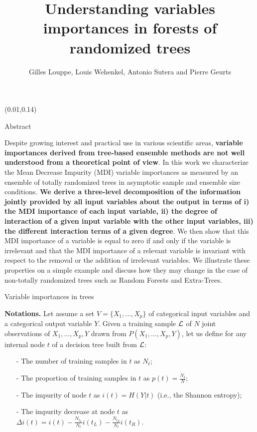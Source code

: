 \documentclass[final]{beamer}
\title{Understanding variables importances in forests of randomized trees}
\author{Gilles Louppe, Louis Wehenkel, Antonio Sutera and Pierre Geurts}
\date{}
\begin{document}
\begin{frame}{}



\begin{textblock}{0.32}(0.01,0.14)


\begin{block}{Abstract \phantom{p}}

Despite growing interest and practical use in various scientific areas, \textbf{variable
importances derived from tree-based ensemble methods are not well understood
from a theoretical point of view}. In this work we characterize the Mean Decrease
Impurity (MDI) variable importances as measured by an ensemble of totally
randomized trees in asymptotic sample and ensemble size conditions. \textbf{We derive a
three-level decomposition of the  information jointly provided by all input
variables about the output in terms of {\color{lightgreen}i) the MDI importance of each input
variable}, {\color{lightblue}ii) the degree of interaction of a given input variable with the other
input variables}, {\color{lightred}iii) the different interaction terms of a given degree}}. We then
show that this MDI importance of a variable is equal to zero if and only if the
variable is irrelevant and that the MDI importance of a relevant variable is
invariant with respect to the removal or the addition of irrelevant variables.
We illustrate these properties on a simple example and discuss how they may
change in the case of  non-totally randomized trees such as Random Forests and
Extra-Trees.

\end{block}

\begin{block}{Variable importances in trees \phantom{p}}

\textbf{Notations.} Let assume a set $V = \{X_1, ..., X_p\}$ of categorical input variables and a categorical output variable $Y$. Given a training sample ${\cal L}$ of $N$ joint observations of $X_1, ..., X_p, Y$ drawn from $P(X_1, ..., X_p, Y)$,
let us define for any internal node $t$ of a decision tree built from ${\cal L}$:
\begin{itemize}
\item[-] The number of training samples in $t$ as $N_t$;
\item[-] The proportion of training samples in $t$ as $p(t) = \frac{N_t}{N}$;
\item[-] The impurity of node $t$ as $i(t) = H(Y|t)$ (i.e., the Shannon entropy);
\item[-] The impurity decrease at node $t$ as $\Delta i(t) = i(t) - \frac{N_{t_L}}{N_t} i(t_L) - \frac{N_{t_R}}{N_t} i(t_R)$.
\end{itemize}


\end{block}
\end{textblock}
\end{frame}
\end{document}
